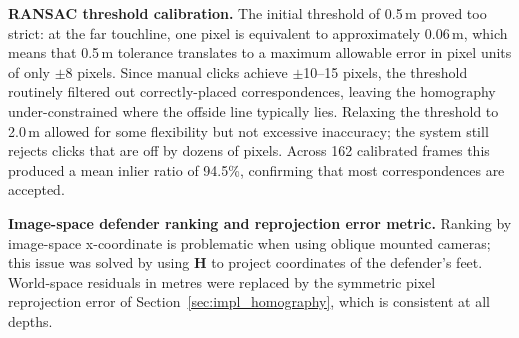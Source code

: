 \textbf{RANSAC threshold calibration.} The initial threshold of 0.5\,m proved too strict: at the far touchline, one pixel is equivalent to approximately 0.06\,m, which means that 0.5\,m tolerance translates to a maximum allowable error in pixel units of only $\pm$8 pixels. Since manual clicks achieve $\pm$10--15 pixels, the threshold routinely filtered out correctly-placed correspondences, leaving the homography under-constrained where the offside line typically lies. Relaxing the threshold to 2.0\,m allowed for some flexibility but not excessive inaccuracy; the system still rejects clicks that are off by dozens of pixels. Across 162 calibrated frames this produced a mean inlier ratio of 94.5\%, confirming that most correspondences are accepted.

\textbf{Image-space defender ranking and reprojection error metric.} Ranking by image-space x-coordinate is problematic when using oblique mounted cameras; this issue was solved by using $\mathbf{H}$ to project coordinates of the defender's feet. World-space residuals in metres were replaced by the symmetric pixel reprojection error of Section~\ref{sec:impl_homography}, which is consistent at all depths.
